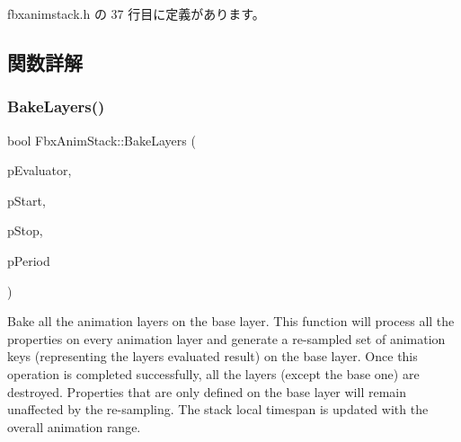  fbxanimstack.\+h の 37 行目に定義があります。



\subsection{関数詳解}
\mbox{\label{class_fbx_anim_stack_a20891f3e62c6a50a628f2ed65616bf36}} 
\subsubsection{\texorpdfstring{Bake\+Layers()}{BakeLayers()}}
{\footnotesize\ttfamily bool Fbx\+Anim\+Stack\+::\+Bake\+Layers (\begin{DoxyParamCaption}\item[{\hyperlink{class_fbx_anim_evaluator}{Fbx\+Anim\+Evaluator} $\ast$}]{p\+Evaluator,  }\item[{\hyperlink{class_fbx_time}{Fbx\+Time}}]{p\+Start,  }\item[{\hyperlink{class_fbx_time}{Fbx\+Time}}]{p\+Stop,  }\item[{\hyperlink{class_fbx_time}{Fbx\+Time}}]{p\+Period }\end{DoxyParamCaption})}

Bake all the animation layers on the base layer. This function will process all the properties on every animation layer and generate a re-\/sampled set of animation keys (representing the layers\textquotesingle{} evaluated result) on the base layer. Once this operation is completed successfully, all the layers (except the base one) are destroyed. Properties that are only defined on the base layer will remain unaffected by the re-\/sampling. The stack local timespan is updated with the overall animation range.


